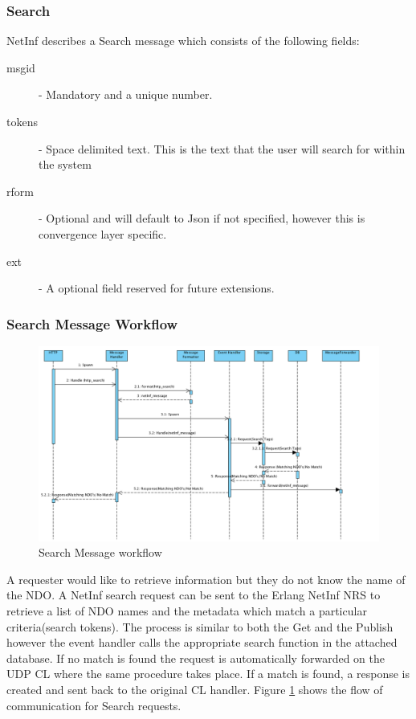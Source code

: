 \subsubsection{Search}

NetInf describes a Search message which consists of the following fields:

\begin{description}
\item[msgid] - Mandatory and a unique number.
\item[tokens] - Space delimited text. This is the text that the user will search for within the system
\item[rform] - Optional and will default to Json if not specified, however this is convergence layer specific.
\item[ext] - A optional field reserved for future extensions.
\end{description}

\subsubsection{Search Message Workflow}

\begin{figure}[H]
	\centering
\centerline{\includegraphics[width=1.2\textwidth]{./img/backend_seq_diagram_SEARCH.png}}
\caption{Search Message workflow}
\label{fig:searchfig}
\end{figure}

A requester would like to retrieve information but they do not know the name of the NDO. A NetInf search request can be sent to the Erlang NetInf NRS to retrieve a list of NDO names and the metadata which match a particular criteria(search tokens). The process is similar to both the Get and the Publish however the event handler calls the appropriate search function in the attached database. If no match is found the request is automatically forwarded on the UDP CL where the same procedure takes place. If a match is found, a response is created  and sent back to the original CL handler. Figure \ref{fig:searchfig} shows the flow of communication for  Search requests.
